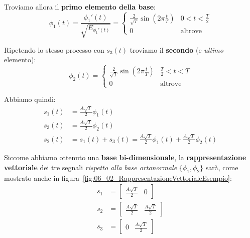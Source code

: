 Troviamo allora il \textbf{primo elemento della base}:
\[
    \phi_{1}(t) = \frac{\phi_{1}'(t)}{\sqrt{E_{\phi_{1}'(t)}}} = 
    \begin{cases}
        \frac{2}{\sqrt{T} } \sin \left( 2\pi \frac{t}{T} \right) & 0 < t < \frac{T}{2} \\ 
        0 & \text{altrove}
    \end{cases}
\]

Ripetendo lo stesso processo con $s_{3}(t)$ troviamo il
\textbf{secondo} (e \textit{ultimo} elemento):
\[
    \phi_{2}(t) = \begin{cases}
        \frac{2}{\sqrt{T} } \sin \left( 2\pi \frac{t}{T} \right) & \frac{T}{2} < t < T \\ 
        0 & \text{altrove}
    \end{cases}
\]

Abbiamo quindi:
\[
    \begin{aligned}
        s_{1}(t) &= \frac{A\sqrt{T}}{2} \phi_{1}(t) \\ 
        s_{3}(t) &= \frac{A\sqrt{T}}{2} \phi_{2}(t) \\ 
        s_{2}(t) &= s_{1}(t) + s_{3}(t) = \frac{A\sqrt{T}}{2} \phi_{1}(t) + \frac{A\sqrt{T}}{2} \phi_{2}(t)
    \end{aligned}
\]

Siccome abbiamo ottenuto una \textbf{base bi-dimensionale}, la 
\textbf{rappresentazione vettoriale} dei tre segnali 
\textit{rispetto alla base ortonormale} $\{\phi_{1}, \phi_{2}\}$ sarà, come mostrato anche in 
figura~\ref{fig:06_02_RappresentazioneVettorialeEsempio}:
\[
    \begin{aligned}
        s_{1} &= \begin{bmatrix} \frac{A\sqrt{T} }{2} & 0 \end{bmatrix} \\ 
        s_{2} &= \begin{bmatrix} \frac{A\sqrt{T} }{2} & \frac{A\sqrt{T} }{2} \end{bmatrix} \\ 
        s_{3} &= \begin{bmatrix} 0 & \frac{A\sqrt{T} }{2} \end{bmatrix}
    \end{aligned}
\]

